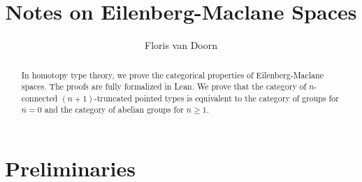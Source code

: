 \documentclass{article}
\theoremstyle{definition}
\theoremstyle{remark}
\begin{document}
\title{Notes on Eilenberg-Maclane Spaces}

\author{Floris van Doorn}
\maketitle

\begin{abstract}
In homotopy type theory, we prove the categorical properties of Eilenberg-Maclane spaces. The proofs
are fully formalized in Lean. We prove that the category of $n$-connected $(n+1)$-truncated pointed
types is equivalent to the category of groups for $n = 0$ and the category of abelian groups for $n
\geq 1$.
\end{abstract}

\section{Preliminaries}
\end{document}
